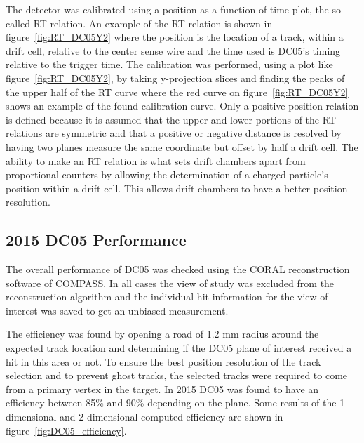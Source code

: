 The detector was calibrated using a position as a function of time
plot, the so called RT relation.  An example of the RT relation is
shown in figure~\ref{fig:RT_DC05Y2} where the position is the location of
a track, within a drift cell, relative to the center sense wire and the 
time used is DC05's timing relative to the trigger time.  The calibration was performed,
using a plot like figure~\ref{fig:RT_DC05Y2}, by taking y-projection
slices and finding the peaks of the upper half of the RT curve where the
red curve on figure~\ref{fig:RT_DC05Y2} shows an example of the found
calibration curve.  Only a positive position relation is defined
because it is assumed that the upper and lower portions of the RT
relations are symmetric and that a positive or negative distance is
resolved by having two planes measure the same coordinate but offset
by half a drift cell.  The ability to make an RT relation is what sets
drift chambers apart from proportional counters by allowing the
determination of a charged particle's position within a drift cell.
This allows drift chambers to have a better position resolution.

\subsection{2015 DC05 Performance}
The overall performance of DC05 was checked using the CORAL
reconstruction software of COMPASS.  In all cases the view of study
was excluded from the reconstruction algorithm and the individual hit
information for the view of interest was saved to get an unbiased
measurement. \par

The efficiency was found by opening a road of 1.2 mm radius around the
expected track location and determining if the DC05 plane of interest
received a hit in this area or not.  To ensure the best position
resolution of the track selection and to prevent ghost tracks, the
selected tracks were required to come from a primary vertex in the
target.  In 2015 DC05 was found to have an efficiency between 85\% and
90\% depending on the plane.  Some results of the 1-dimensional and
2-dimensional computed efficiency are shown in
figure~\ref{fig:DC05_efficiency}. \par



